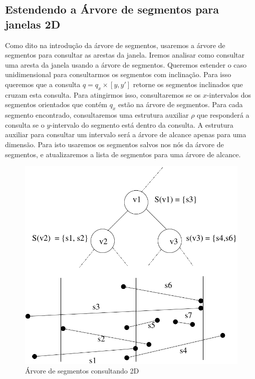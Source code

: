 \subsection{Estendendo a Árvore de segmentos para janelas 2D}
Como dito na introdução da árvore de segmentos, usaremos a árvore de segmentos para consultar as arestas da janela. Iremos analisar como consultar uma aresta da janela usando a árvore de segmentos. Queremos estender o caso unidimensional para consultarmos os segmentos com inclinação. Para isso queremos que a consulta $q = q_x \times [y, y']$ retorne os segmentos inclinados que cruzam esta consulta. Para atingirmos isso, consultaremos se os $x$-intervalos dos segmentos orientados que contém $q_x$ estão na árvore de segmentos. Para cada segmento encontrado, consultaremos uma estrutura auxiliar $\rho$ que responderá a consulta se o $y$-intervalo do segmento está dentro da consulta. A estrutura auxiliar para consultar um intervalo será a árvore de alcance apenas para uma dimensão. Para isto usaremos os segmentos salvos nos nós da árvore de segmentos, e atualizaremos a lista de segmentos para uma árvore de alcance.

\begin{figure}[h!]
    \centering
    \includegraphics[scale=0.7]{images/segmentos_2d.pdf}
    \caption{Árvore de segmentos consultando 2D }
    \label{fig:my_label}
\end{figure}

